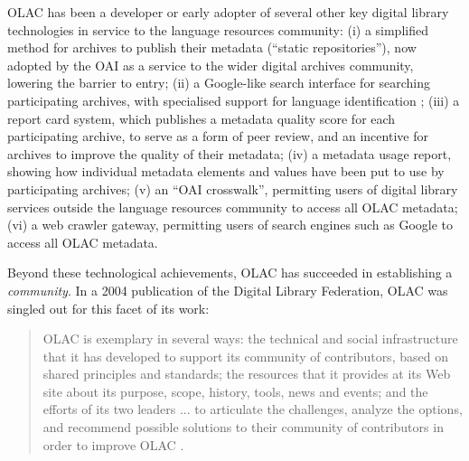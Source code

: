 
OLAC has been a developer or early adopter of several other key
digital library technologies in service to the language resources
community:
(i) a simplified method for archives to publish their metadata
  (``static repositories''), now adopted by the OAI as a service
  to the wider digital archives community, lowering the barrier to entry;
(ii) a Google-like search interface for searching participating
  archives, with specialised support for language identification
  \citep{HughesKamat05,Hughes06lrec};
(iii) a report card system, which publishes a metadata quality score
  for each participating archive, to serve as a form of
  peer review, and an incentive for archives to improve the quality of
  their metadata;
(iv) a metadata usage report, showing how individual metadata
  elements and values have been put to use by participating archives;
(v) an ``OAI crosswalk'', permitting users of digital library services
  outside the language resources community to access all OLAC metadata;
(vi) a web crawler gateway, permitting users of search engines such
  as Google to access all OLAC metadata.

Beyond these technological achievements, OLAC has succeeded in
establishing a \emph{community}.  In a 2004 publication of the
Digital Library Federation, OLAC was singled out for this
facet of its work:

\begin{quote} \small
  OLAC is exemplary in several ways: the technical and social
  infrastructure that it has developed to support its community of
  contributors, based on shared principles and standards; the
  resources that it provides at its Web site about its purpose, scope,
  history, tools, news and events; and the efforts of its two leaders
  ... to articulate the challenges, analyze the options, and recommend
  possible solutions to their community of contributors in order to
  improve OLAC \citep{Brogan04}.
\end{quote}


